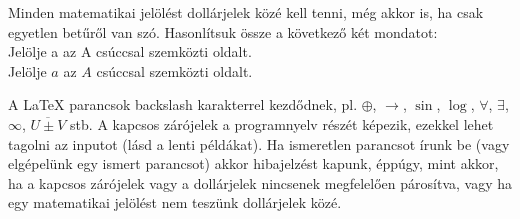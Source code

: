 \documentclass[a4paper]{article}
\begin{document}

Minden matematikai jelölést dollárjelek közé kell tenni, 
még akkor is, ha csak egyetlen betűről van szó. 
Hasonlítsuk össze a következő két mondatot:\\ %
Jelölje a az A csúccsal szemközti oldalt.\\
Jelölje $a$ az $A$ csúccsal szemközti oldalt.

A LaTeX parancsok backslash karakterrel kezdődnek, pl. $\oplus$, $\rightarrow$, $\sin$, $\log$, $\forall$, $\exists$, $\infty$, $\overline{U \pm V}$ stb. A kapcsos zárójelek a programnyelv részét képezik, ezekkel lehet tagolni az inputot (lásd a lenti példákat). Ha ismeretlen parancsot írunk be (vagy elgépelünk egy ismert parancsot) akkor hibajelzést kapunk, éppúgy, mint akkor, ha a kapcsos zárójelek vagy a dollárjelek nincsenek megfelelően párosítva, vagy ha egy matematikai jelölést nem teszünk dollárjelek közé.

\bigskip %
\end{document}
